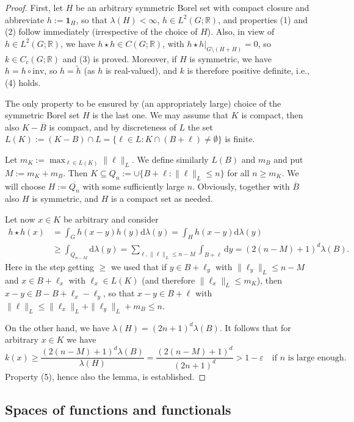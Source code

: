 \documentclass[[a4paper,english,12pt]{amsart}
\theoremstyle{plain}
\theoremstyle{remark}
\newcommand{\ve}{\varepsilon}
\newcommand{\RR}{\mathbb R}
\def\inv{\mathrm{inv}}
\def\dd{\mathrm{d}}
\def\haar{\lambda}
\def\one{\mathbf{1}}
\begin{document}
\begin{proof}
	First, let $H$ be an arbitrary symmetric Borel set with compact closure and abbreviate $h:=\one_H$, so that $\haar(H)<\infty$,  $h \in L^2(G;\RR)$, and properties (1) and (2) follow immediately (irrespective of the choice of $H$). Also, in view of $h \in L^2(G;\RR)$, we have $h\star h \in C(G;\RR)$, with $h\star h|_{G\setminus(H+H)}=0$, so $k \in  C_c(G;\RR)$  and (3) is proved. Moreover, if $H$ is symmetric, we have $h=h\circ\inv$, so $h=\widetilde h$ (as $h$ is real-valued), and $k$ is therefore positive definite, i.e., (4) holds.

The only property to be ensured by (an appropriately large) choice of the symmetric Borel set $H$ is the last one.  We may assume that $K$ is compact, then also $K-\overline{B}$ is compact, and by discreteness of $L$ the set $L(K):=(K-B)\cap L = \{\ell \in L :  K \cap (B+ \ell ) \ne \emptyset \}$ is finite.

Let $m_K:=\max_{\ell \in L(K)} \|\ell\|_L$. We define similarly $L(B)$ and $m_B$ and put $M:=m_K+m_B$.
 Then $K \subseteq  Q_n:=\cup \{ B+\ell : \|\ell\|_L \le n\}$ for all $n \ge m_K$. We will choose $H:=\overline{Q_n}$ with some sufficiently large $n$. Obviously, together with $\overline{B}$ also $H$ is symmetric, and $H$ is a compact set as needed.

Let now $x \in K$ be arbitrary and consider
\begin{align*} h\star h (x) & = \int_G h(x-y) h(y) \dd  \lambda(y) = \int_H h(x-y) \dd \lambda(y)
\\ & \ge \int_{Q_{n-M}} \dd \lambda(y) = \sum_{\ell, \|\ell\|_L\le n-M} \int_{B+\ell} \dd y = (2(n-M)+1)^d \haar(B).
\end{align*}
Here in the step getting $\ge$ we used that if $y \in B+\ell_y$ with $\|\ell_y\|_L \le n-M$ and $x \in B+\ell_x$ with $\ell_x \in L(K)$ (and therefore $\|\ell_x\|_L\le m_K$), then $x-y \in B-B+\ell_x-\ell_y$, so that $x-y \in B+\ell$ with $\| \ell \|_L \le \|\ell_x\|_L +\|\ell_y\|_L+m_B \le n $.

On the other hand, we have $\haar(H)=(2n+1)^d \haar(B)$. It follows that for arbitrary $x \in K$ we have
\[
k(x) \ge \frac{(2(n-M)+1)^d\haar(B)}{\haar(H)}=\frac{(2(n-M)+1)^d }{(2n+1)^d} >1-\ve\quad\text{if $n$ is large enough}.
\]
Property (5), hence also the lemma, is established.
\end{proof}


%
%
 \subsection{Spaces of functions and functionals}
\end{document}
